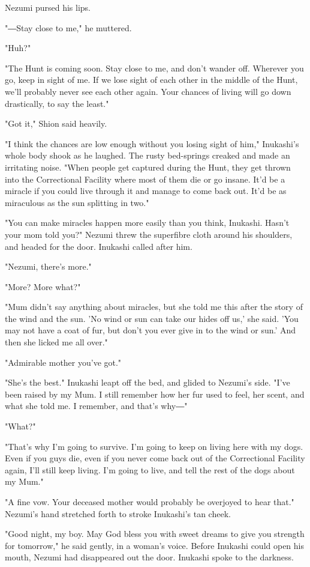 Nezumi pursed his lips.

"―Stay close to me," he muttered.

"Huh?"

"The Hunt is coming soon. Stay close to me, and don't wander off.
Wherever you go, keep in sight of me. If we lose sight of each other in
the middle of the Hunt, we'll probably never see each other again. Your
chances of living will go down drastically, to say the least."

"Got it," Shion said heavily.

"I think the chances are low enough without you losing sight of him,"
Inukashi's whole body shook as he laughed. The rusty bed-springs creaked
and made an irritating noise. "When people get captured during the Hunt,
they get thrown into the Correctional Facility where most of them die or
go insane. It'd be a miracle if you could live through it and manage to
come back out. It'd be as miraculous as the sun splitting in two."

"You can make miracles happen more easily than you think, Inukashi.
Hasn't your mom told you?" Nezumi threw the superfibre cloth around his
shoulders, and headed for the door. Inukashi called after him.

"Nezumi, there's more."

"More? More what?"

"Mum didn't say anything about miracles, but she told me this after the
story of the wind and the sun. 'No wind or sun can take our hides off
us,' she said. 'You may not have a coat of fur, but don't you ever give
in to the wind or sun.' And then she licked me all over."

"Admirable mother you've got."

"She's the best." Inukashi leapt off the bed, and glided to Nezumi's
side. "I've been raised by my Mum. I still remember how her fur used to
feel, her scent, and what she told me. I remember, and that's why―"

"What?"

"That's why I'm going to survive. I'm going to keep on living here with
my dogs. Even if you guys die, even if you never come back out of the
Correctional Facility again, I'll still keep living. I'm going to live,
and tell the rest of the dogs about my Mum."

"A fine vow. Your deceased mother would probably be overjoyed to hear
that." Nezumi's hand stretched forth to stroke Inukashi's tan cheek.

"Good night, my boy. May God bless you with sweet dreams to give you
strength for tomorrow," he said gently, in a woman's voice. Before
Inukashi could open his mouth, Nezumi had disappeared out the door.
Inukashi spoke to the darkness.

